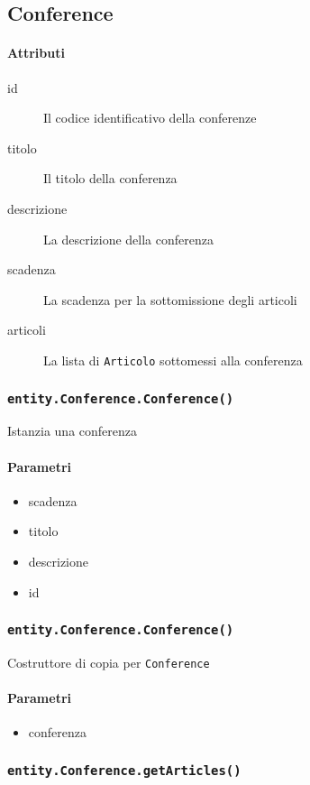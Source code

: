 \subsection{Conference}
\paragraph{Attributi}
\begin{description}
\item[id] Il codice identificativo della conferenze
\item[titolo] Il titolo della conferenza
\item[descrizione] La descrizione della conferenza
\item[scadenza] La scadenza per la sottomissione degli articoli
\item[articoli] La lista di \texttt{Articolo} sottomessi alla conferenza
\end{description}

\subsubsection{\texttt{entity.Conference.Conference()}}
Istanzia una conferenza
\paragraph{Parametri}
\begin{itemize}
\item scadenza
\item titolo
\item descrizione
\item id
\end{itemize}

\subsubsection{\texttt{entity.Conference.Conference()}}
Costruttore di copia per \texttt{Conference}
\paragraph{Parametri}
\begin{itemize}
\item conferenza
\end{itemize}

\subsubsection{\texttt{entity.Conference.getArticles()}}
